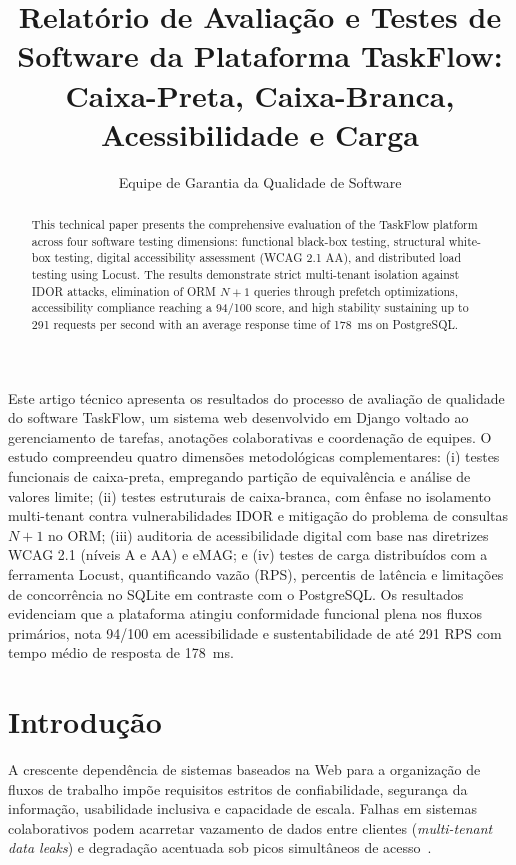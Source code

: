 \documentclass[12pt]{article}
\title{Relatório de Avaliação e Testes de Software da Plataforma TaskFlow: Caixa-Preta, Caixa-Branca, Acessibilidade e Carga}
\author{Equipe de Garantia da Qualidade de Software\inst{1}}
\begin{document}
\maketitle

\begin{abstract}
This technical paper presents the comprehensive evaluation of the TaskFlow platform across four software testing dimensions: functional black-box testing, structural white-box testing, digital accessibility assessment (WCAG 2.1 AA), and distributed load testing using Locust. The results demonstrate strict multi-tenant isolation against IDOR attacks, elimination of ORM $N+1$ queries through prefetch optimizations, accessibility compliance reaching a 94/100 score, and high stability sustaining up to 291 requests per second with an average response time of 178~ms on PostgreSQL.
\end{abstract}

\begin{resumo}
Este artigo técnico apresenta os resultados do processo de avaliação de qualidade do software TaskFlow, um sistema web desenvolvido em Django voltado ao gerenciamento de tarefas, anotações colaborativas e coordenação de equipes. O estudo compreendeu quatro dimensões metodológicas complementares: (i) testes funcionais de caixa-preta, empregando partição de equivalência e análise de valores limite; (ii) testes estruturais de caixa-branca, com ênfase no isolamento multi-tenant contra vulnerabilidades IDOR e mitigação do problema de consultas $N+1$ no ORM; (iii) auditoria de acessibilidade digital com base nas diretrizes WCAG 2.1 (níveis A e AA) e eMAG; e (iv) testes de carga distribuídos com a ferramenta Locust, quantificando vazão (RPS), percentis de latência e limitações de concorrência no SQLite em contraste com o PostgreSQL. Os resultados evidenciam que a plataforma atingiu conformidade funcional plena nos fluxos primários, nota 94/100 em acessibilidade e sustentabilidade de até 291 RPS com tempo médio de resposta de 178~ms.
\end{resumo}

\section{Introdução}

A crescente dependência de sistemas baseados na Web para a organização de fluxos de trabalho impõe requisitos estritos de confiabilidade, segurança da informação, usabilidade inclusiva e capacidade de escala. Falhas em sistemas colaborativos podem acarretar vazamento de dados entre clientes (\textit{multi-tenant data leaks}) e degradação acentuada sob picos simultâneos de acesso~\cite{pressman2021}.
\end{document}
